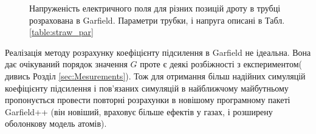 \documentclass[pdftex,14pt]{scrartcl}
\begin{document}
\begin{spacing}{1.5}
	\begin{figure}[!h] 
		\centering
		\qquad
		\caption{ Напруженість електричного поля для різних позицій дроту в трубці розрахована в Garfield. Параметри трубки, і напруга описані в Табл.\ref{table:straw_par}}
	\end{figure}
	
	Реалізація методу розрахунку коефіцієнту підсилення в Garfield не ідеальна. Вона дає очікуваний порядок значення $G$ проте є деякі розбіжності з експериментом( дивись Розділ \ref{sec:Mesurements}). Тож для отримання більш надійних симуляцій коефіцієнту підсилення і пов'язаних симуляцій в найближчому майбутньому пропонується провести повторні розрахунки в новішому програмному пакеті Garfield++ \cite{garfieldpp} (він новіший, враховує більше ефектів у газах, і розширену оболонкову модель атомів).
	
	

\end{spacing}
\end{document}
